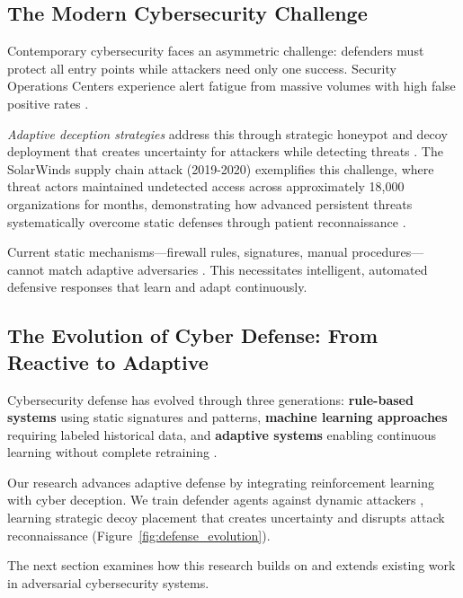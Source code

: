 \documentclass[12pt,oneside]{article}
\begin{document}
\subsection{The Modern Cybersecurity Challenge}

Contemporary cybersecurity faces an asymmetric challenge: defenders must protect all entry points while attackers need only one success. Security Operations Centers experience alert fatigue from massive volumes with high false positive rates \cite{sommer2010outside}.

\textit{Adaptive deception strategies} address this through strategic honeypot and decoy deployment that creates uncertainty for attackers while detecting threats \cite{anwar2022honeypot}. The SolarWinds supply chain attack (2019-2020) exemplifies this challenge, where threat actors maintained undetected access across approximately 18,000 organizations for months, demonstrating how advanced persistent threats systematically overcome static defenses through patient reconnaissance \cite{gao2021solarwinds}.

Current static mechanisms—firewall rules, signatures, manual procedures—cannot match adaptive adversaries \cite{apruzzese2022deep}. This necessitates intelligent, automated defensive responses that learn and adapt continuously.


\subsection{The Evolution of Cyber Defense: From Reactive to Adaptive}

Cybersecurity defense has evolved through three generations: \textbf{rule-based systems} using static signatures and patterns, \textbf{machine learning approaches} requiring labeled historical data, and \textbf{adaptive systems} enabling continuous learning without complete retraining \cite{alpcan2010network}.

Our research advances adaptive defense by integrating reinforcement learning with cyber deception. We train defender agents against dynamic attackers \cite{sutton2018reinforcement}, learning strategic decoy placement that creates uncertainty and disrupts attack reconnaissance (Figure~\ref{fig:defense_evolution}).

The next section examines how this research builds on and extends existing work in adversarial cybersecurity systems.
\end{document}
